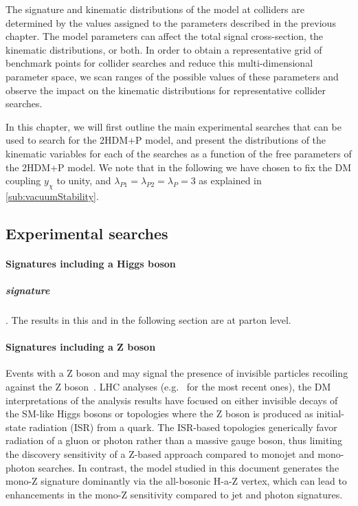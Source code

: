 The signature and kinematic distributions of the \hdma model at colliders are determined by the values assigned to the parameters described in the previous chapter. 
The model parameters can affect the total signal cross-section, the kinematic distributions, or both. 
In order to obtain a representative grid of benchmark points for collider searches and reduce this multi-dimensional parameter space, we scan ranges of the possible values of these parameters and observe the impact on the kinematic distributions for representative collider searches.


In this chapter, we will first outline the main experimental searches that can be used to search for the 2HDM+P model, and present the distributions of the kinematic variables for each of the searches as a function of the free parameters of the 2HDM+P model. We note that in the following we have chosen to fix the DM coupling  $y_\chi$ to unity, and $\lambda_{P1} = \lambda_{P2} = \lambda_P = 3$ as explained in \autoref{sub:vacuumStability}.  

\subsection{Experimental searches}

\paragraph{Signatures including a Higgs boson }

\subparagraph{\monohbb signature}. The results in this and in the following section are at parton level. 
 
\cite{Aaboud:2017yqz}

\paragraph{Signatures including a Z boson}

Events with a Z boson and \MET may signal the presence of invisible particles recoiling against the Z boson~\cite{Carpenter:2012rg,Bell:2012rg}. 
LHC analyses (e.g.~\cite{Aaboud:2017bja,Sirunyan:2017qfc} for the most recent ones), the DM interpretations of the analysis results have focused on either invisible decays of the SM-like Higgs bosons or topologies where the Z boson is produced as initial-state radiation (ISR) from a quark. The ISR-based topologies generically favor radiation of a gluon or photon rather than a massive gauge boson, thus limiting the discovery sensitivity of a Z-based approach compared to monojet and mono-photon searches. In contrast, the model studied in this document generates the mono-Z signature dominantly via the all-bosonic H-a-Z vertex, which can lead to enhancements in the mono-Z sensitivity compared to jet and photon signatures. 

